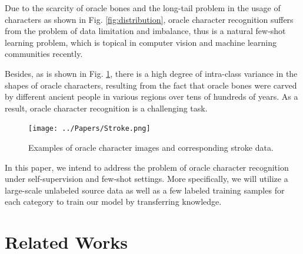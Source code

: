 \documentclass{article}
\begin{document}
Due to the scarcity of oracle bones and the long-tail problem in the usage of characters as shown in Fig. \ref{fig:distribution}, oracle character recognition suffers from the problem of data limitation and imbalance, thus is a natural few-shot learning problem, which is topical in computer vision and machine learning communities recently. 

Besides, as is shown in Fig. \ref{fig:stroke}, there is a high degree of intra-class variance in the shapes of oracle characters, resulting from the fact that oracle bones were carved by different ancient people in various regions over tens of hundreds of years. As a result, oracle character recognition is a challenging task.

\begin{figure}[h]
	\centering
	\texttt{[image: ../Papers/Stroke.png]}
	\caption{Examples of oracle character images and corresponding stroke data.}
	\label{fig:stroke}
\end{figure}

In this paper, we intend to address the problem of oracle character recognition under self-supervision and few-shot settings. More specifically, we will utilize a large-scale unlabeled source data as well as a few labeled training samples for each category to train our model by transferring knowledge.

\section{Related Works}
\label{sec:related}
\end{document}

